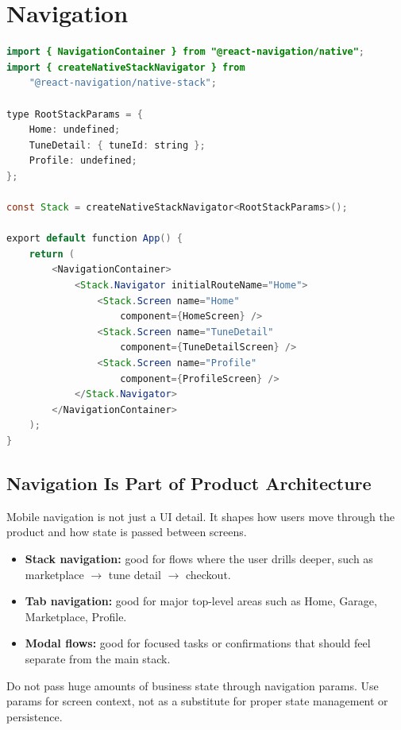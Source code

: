 \documentclass[12pt, a4paper, oneside]{book}
\begin{document}
\section{Navigation}

\begin{lstlisting}[language=Java, caption={React Navigation setup}]
import { NavigationContainer } from "@react-navigation/native";
import { createNativeStackNavigator } from
    "@react-navigation/native-stack";

type RootStackParams = {
    Home: undefined;
    TuneDetail: { tuneId: string };
    Profile: undefined;
};

const Stack = createNativeStackNavigator<RootStackParams>();

export default function App() {
    return (
        <NavigationContainer>
            <Stack.Navigator initialRouteName="Home">
                <Stack.Screen name="Home"
                    component={HomeScreen} />
                <Stack.Screen name="TuneDetail"
                    component={TuneDetailScreen} />
                <Stack.Screen name="Profile"
                    component={ProfileScreen} />
            </Stack.Navigator>
        </NavigationContainer>
    );
}
\end{lstlisting}

\subsection{Navigation Is Part of Product Architecture}

Mobile navigation is not just a UI detail. It shapes how users move through the product and how state is passed between screens.

\begin{itemize}[leftmargin=2em]
    \item \textbf{Stack navigation:} good for flows where the user drills deeper, such as marketplace $\to$ tune detail $\to$ checkout.
    \item \textbf{Tab navigation:} good for major top-level areas such as Home, Garage, Marketplace, Profile.
    \item \textbf{Modal flows:} good for focused tasks or confirmations that should feel separate from the main stack.
\end{itemize}

\begin{warningbox}
Do not pass huge amounts of business state through navigation params. Use params for screen context, not as a substitute for proper state management or persistence.
\end{warningbox}
\end{document}
